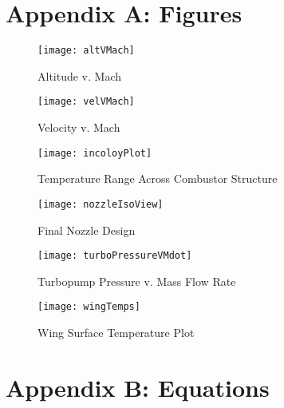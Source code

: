 \section{Appendix A: Figures}

\begin{figure}[H]
\begin{center}
\texttt{[image: altVMach]}
\caption{Altitude v. Mach}
\label{fig:altVMach}
\end{center}
\end{figure}

\begin{figure}[H]
\begin{center}
\texttt{[image: velVMach]}
\caption{Velocity v. Mach}
\label{fig:velVMach}
\end{center}
\end{figure}

\begin{figure}[H]
\begin{center}
\texttt{[image: incoloyPlot]}
\caption{Temperature Range Across Combustor Structure \cite{inco}}
\label{fig:incoloyPlot}
\end{center}
\end{figure}

\begin{figure}[H]
\begin{center}
\texttt{[image: nozzleIsoView]}
\caption{Final Nozzle Design}
\label{fig:nozzleIsoView}
\end{center}
\end{figure}

\begin{figure}[H]
\begin{center}
\texttt{[image: turboPressureVMdot]}
\caption{Turbopump Pressure v. Mass Flow Rate}
\label{fig:turboPressureVMdot}
\end{center}
\end{figure}


\begin{figure}[H]
\begin{center}
\texttt{[image: wingTemps]}
\caption{Wing Surface Temperature Plot}
\label{fig:wingTemps}
\end{center}
\end{figure}


\newpage
\section{Appendix B: Equations}

